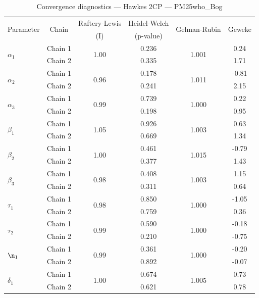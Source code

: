 \begin{table}[H]
\centering
\caption{Convergence diagnostics — Hawkes 2CP — PM25who_Bog}
\begin{tabular}{lccccc}
\toprule
\multirow{2}{*}{Parameter} & \multirow{2}{*}{Chain} & Raftery-Lewis & Heidel-Welch & \multirow{2}{*}{Gelman-Rubin} & \multirow{2}{*}{Geweke} \\
 & & (I) & (p-value) & & (z) \\
\midrule
\multirow{2}{*}{$\alpha_1$} & Chain 1 & \multirow{2}{*}{1.00} & 0.236 & \multirow{2}{*}{1.001} & 0.24 \\
 & Chain 2 & & 0.335 & & 1.71 \\
\multirow{2}{*}{$\alpha_2$} & Chain 1 & \multirow{2}{*}{0.96} & 0.178 & \multirow{2}{*}{1.011} & -0.81 \\
 & Chain 2 & & 0.241 & & 2.15 \\
\multirow{2}{*}{$\alpha_3$} & Chain 1 & \multirow{2}{*}{0.99} & 0.739 & \multirow{2}{*}{1.000} & 0.22 \\
 & Chain 2 & & 0.198 & & 0.95 \\
\midrule
\multirow{2}{*}{$\beta_1$} & Chain 1 & \multirow{2}{*}{1.05} & 0.926 & \multirow{2}{*}{1.003} & 0.63 \\
 & Chain 2 & & 0.669 & & 1.34 \\
\multirow{2}{*}{$\beta_2$} & Chain 1 & \multirow{2}{*}{1.00} & 0.461 & \multirow{2}{*}{1.015} & -0.79 \\
 & Chain 2 & & 0.377 & & 1.43 \\
\multirow{2}{*}{$\beta_3$} & Chain 1 & \multirow{2}{*}{0.98} & 0.408 & \multirow{2}{*}{1.003} & 1.15 \\
 & Chain 2 & & 0.311 & & 0.64 \\
\midrule
\multirow{2}{*}{$\tau_1$} & Chain 1 & \multirow{2}{*}{0.98} & 0.850 & \multirow{2}{*}{1.000} & -1.05 \\
 & Chain 2 & & 0.759 & & 0.36 \\
\multirow{2}{*}{$\tau_2$} & Chain 1 & \multirow{2}{*}{0.99} & 0.590 & \multirow{2}{*}{1.000} & -0.18 \\
 & Chain 2 & & 0.210 & & -0.75 \\
\midrule
\multirow{2}{*}{$\n_1$} & Chain 1 & \multirow{2}{*}{0.99} & 0.361 & \multirow{2}{*}{1.000} & -0.20 \\
 & Chain 2 & & 0.892 & & -0.07 \\
\midrule
\multirow{2}{*}{$\delta_1$} & Chain 1 & \multirow{2}{*}{1.00} & 0.674 & \multirow{2}{*}{1.005} & 0.73 \\
 & Chain 2 & & 0.621 & & 0.78 \\
\bottomrule
\end{tabular}
\end{table}
